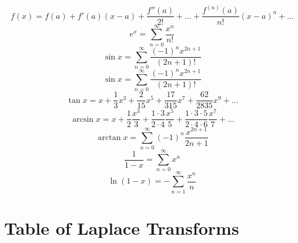 \documentclass[10pt,driverfallback=hypertex]{report}
\begin{document}
\begin{dmath*}
  f(x) = f(a) + f'(a)(x-a) + \frac{f''(a)}{2!} + \dots
  + \frac{f^{(n)}(a)}{n!}(x-a)^n + \dots
\end{dmath*}
\begin{dmath*}
  e^x = \sum_{n=0}^\infty \frac{x^n}{n!}
\end{dmath*}
\begin{dmath*}
  \sin x = \sum_{n=0}^\infty \frac{(-1)^n x^{2n+1}}{(2n+1)!}
\end{dmath*}
\begin{dmath*}
  \sin x = \sum_{n=0}^\infty \frac{(-1)^n x^{2n+1}}{(2n+1)!}
\end{dmath*}
\begin{dmath*}
  \tan x = x + \frac{1}{3}x^3 + \frac{2}{15}x^5 + \frac{17}{315}x^7
  + \frac{62}{2835}x^9 + \dots
\end{dmath*}
\begin{dmath*}
  \arcsin x = x + \frac{1}{2}\frac{x^3}{3}
  + \frac{1\cdot 3}{2\cdot 4}\frac{x^5}{5}
  + \frac{1\cdot3\cdot5}{2\cdot4\cdot6}\frac{x^7}{7} + \dots
\end{dmath*}
\begin{dmath*}
  \arctan x = \sum_{n=0}^\infty (-1)^n \frac{x^{2n+1}}{2n+1}
\end{dmath*}
\begin{dmath*}
  \frac{1}{1-x} = \sum_{n=0}^\infty x^n
\end{dmath*}
\begin{dmath*}
  \ln(1-x) = -\sum_{n=1}^\infty \frac{x^n}{n}
\end{dmath*}

\newpage
\section{Table of Laplace Transforms}
\end{document}
